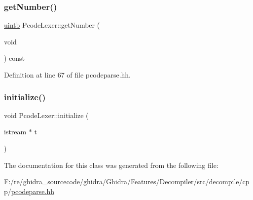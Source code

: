 \mbox{\label{class_pcode_lexer_a09318b61d5248314ed73e78357aa4fd3}} 
\subsubsection{\texorpdfstring{getNumber()}{getNumber()}}
{\footnotesize\ttfamily \mbox{\hyperlink{types_8h_a2db313c5d32a12b01d26ac9b3bca178f}{uintb}} Pcode\+Lexer\+::get\+Number (\begin{DoxyParamCaption}\item[{void}]{ }\end{DoxyParamCaption}) const\hspace{0.3cm}{\ttfamily [inline]}}



Definition at line 67 of file pcodeparse.\+hh.

\mbox{\label{class_pcode_lexer_a2c12526239c45121850c81103a322170}} 
\subsubsection{\texorpdfstring{initialize()}{initialize()}}
{\footnotesize\ttfamily void Pcode\+Lexer\+::initialize (\begin{DoxyParamCaption}\item[{istream $\ast$}]{t }\end{DoxyParamCaption})}



The documentation for this class was generated from the following file\+:\begin{DoxyCompactItemize}
\item 
F\+:/re/ghidra\+\_\+sourcecode/ghidra/\+Ghidra/\+Features/\+Decompiler/src/decompile/cpp/\mbox{\hyperlink{pcodeparse_8hh}{pcodeparse.\+hh}}\end{DoxyCompactItemize}
